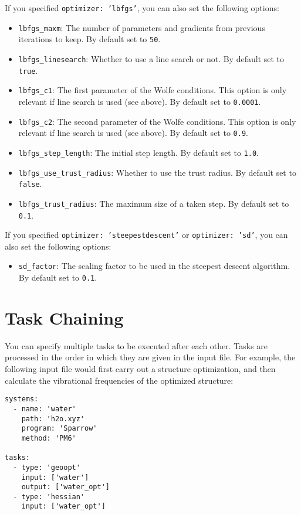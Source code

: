 \documentclass[]{tufte-book}
\begin{document}
If you specified \texttt{optimizer: 'lbfgs'}, you can also set the following options:
\begin{itemize}
\item \texttt{lbfgs\_maxm}: The number of parameters and gradients from previous iterations to keep. By default set to 
\texttt{50}.
\item \texttt{lbfgs\_linesearch}: Whether to use a line search or not. By default set to \texttt{true}.
\item \texttt{lbfgs\_c1}: The first parameter of the Wolfe conditions. This option is only relevant if line search is
used (see above). By default set to \texttt{0.0001}.
\item \texttt{lbfgs\_c2}:  The second parameter of the Wolfe conditions. This option is only relevant if line search is
used (see above). By default set to \texttt{0.9}.
\item \texttt{lbfgs\_step\_length}: The initial step length. By default set to \texttt{1.0}.
\item \texttt{lbfgs\_use\_trust\_radius}: Whether to use the trust radius. By default set to \texttt{false}.
\item \texttt{lbfgs\_trust\_radius}: The maximum size of a taken step. By default set to \texttt{0.1}.
\end{itemize}

If you specified \texttt{optimizer: 'steepestdescent'} or \texttt{optimizer: 'sd'}, you can also set the following options:
\begin{itemize}
\item \texttt{sd\_factor}: The scaling factor to be used in the steepest descent algorithm. By default set to \texttt{0.1}.
\end{itemize}

\section{Task Chaining}
\label{sec:task_chaining}

You can specify multiple tasks to be executed after each other. Tasks are processed in the order in which they are given in 
the input file. For example, the following input file would first carry out a structure optimization, and then calculate
the vibrational frequencies of the optimized structure:

\begin{verbatim}
systems:
  - name: 'water'
    path: 'h2o.xyz'
    program: 'Sparrow'
    method: 'PM6'

tasks:
  - type: 'geoopt'
    input: ['water']
    output: ['water_opt']
  - type: 'hessian'
    input: ['water_opt']
\end{verbatim}
\end{document}
